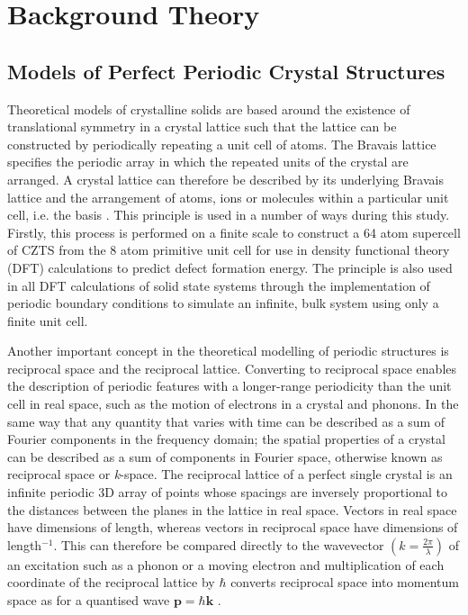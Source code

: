 
\chapter{Background Theory}

\label{ch:background}

\section{Models of Perfect Periodic Crystal Structures}\label{perfect_periodic}
Theoretical models of crystalline solids are based around the existence of translational symmetry in a crystal lattice such that the lattice can be constructed by periodically repeating a unit cell of atoms. The Bravais lattice specifies the periodic array in which the repeated units of the crystal are arranged. A crystal lattice can therefore be described by its underlying Bravais lattice and the arrangement of atoms, ions or molecules within a particular unit cell, i.e. the basis \cite{AshcroftMermin2}. This principle is used in a number of ways during this study. Firstly, this process is performed on a finite scale to construct a 64 atom supercell of CZTS from the 8 atom primitive unit cell for use in density functional theory (DFT) calculations to predict defect formation energy. The principle is also used in all DFT calculations of solid state systems through the implementation of periodic boundary conditions to simulate an infinite, bulk system using only a finite unit cell.
 
Another important concept in the theoretical modelling of periodic structures is reciprocal space and the reciprocal lattice. 
Converting to reciprocal space enables the description of periodic features with a longer-range periodicity than the unit cell in real space, such as the motion of electrons in a crystal and phonons.
In the same way that any quantity that varies with time can be described as a sum of Fourier components in the frequency domain; the spatial properties of a crystal can be described as a sum of components in Fourier space, otherwise known as reciprocal space or \textit{k}-space. The reciprocal lattice of a perfect single crystal is an infinite periodic 3D array of points whose spacings are inversely proportional to the distances between the planes in the lattice in real space. Vectors in real space have dimensions of length, whereas vectors in reciprocal space have dimensions of length$^{-1}$. This can therefore be compared directly to the wavevector $ \left(k  = \frac{2\pi}{\lambda} \right)$ of an excitation such as a phonon or a moving electron and multiplication of each coordinate of the reciprocal lattice by $\hbar$ converts reciprocal space into momentum space as for a quantised wave $\mathbf{p} = \hbar \mathbf{k}$ \cite{Blakemore1}. 

